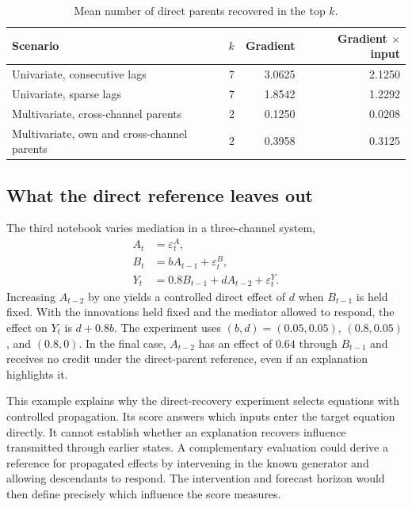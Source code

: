 \begin{table}[htbp]
\centering
\caption{Mean number of direct parents recovered in the top $k$.}
\label{tab:post-hoc-top-k}
\begin{tabular}{lrrr}
\toprule
Scenario & $k$ & Gradient & Gradient $\times$ input \\
\midrule
Univariate, consecutive lags & 7 & 3.0625 & 2.1250 \\
Univariate, sparse lags & 7 & 1.8542 & 1.2292 \\
Multivariate, cross-channel parents & 2 & 0.1250 & 0.0208 \\
Multivariate, own and cross-channel parents & 2 & 0.3958 & 0.3125 \\
\bottomrule
\end{tabular}
\end{table}

\subsection{What the direct reference leaves out}

The third notebook varies mediation in a three-channel system,
\begin{align*}
A_t &= \varepsilon_t^A, \\
B_t &= b A_{t-1} + \varepsilon_t^B, \\
Y_t &= 0.8 B_{t-1} + d A_{t-2} + \varepsilon_t^Y.
\end{align*}
Increasing $A_{t-2}$ by one yields a controlled direct effect of $d$ when
$B_{t-1}$ is held fixed. With the innovations held fixed and the mediator
allowed to respond, the effect on $Y_t$ is $d+0.8b$. The experiment uses
$(b,d)=(0.05,0.05)$, $(0.8,0.05)$, and $(0.8,0)$. In the final case,
$A_{t-2}$ has an effect of $0.64$ through $B_{t-1}$ and receives no credit
under the direct-parent reference, even if an explanation highlights it.

This example explains why the direct-recovery experiment selects equations
with controlled propagation. Its score answers which inputs enter the target
equation directly. It cannot establish whether an explanation recovers
influence transmitted through earlier states. A complementary evaluation could
derive a reference for propagated effects by intervening in the known
generator and allowing descendants to respond. The intervention and forecast
horizon would then define precisely which influence the score measures.
